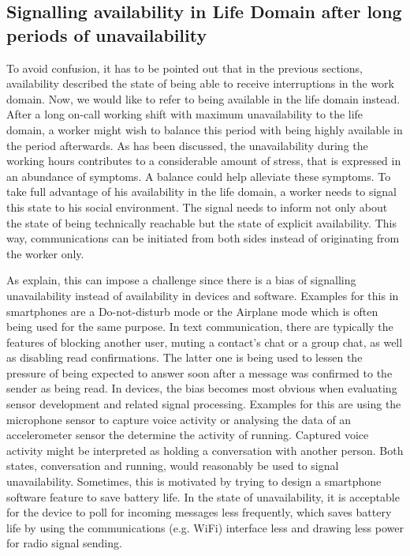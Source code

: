 \documentclass{CML_Seminar_Template}
\begin{document}
\subsection{Signalling availability in Life Domain after long periods of unavailability}
To avoid confusion, it has to be pointed out that in the previous sections, availability described the state of being able to receive interruptions in the work domain. Now, we would like to refer to being available in the life domain instead. After a long on-call working shift with maximum unavailability to the life domain, a worker might wish to balance this period with being highly available in the period afterwards. As has been discussed, the unavailability during the working hours contributes to a considerable amount of stress, that is expressed in an abundance of symptoms. A balance could help alleviate these symptoms. To take full advantage of his availability in the life domain, a worker needs to signal this state to his social environment. The signal needs to inform not only about the state of being technically reachable but the state of explicit availability. This way, communications can be initiated from both sides instead of originating from the worker only.
\par
As \cite[]{Fetter2018} explain, this can impose a challenge since there is a bias of signalling unavailability instead of availability in devices and software. Examples for this in smartphones are a Do-not-disturb mode or the Airplane mode which is often being used for the same purpose. In text communication, there are typically the features of blocking another user, muting a contact's chat or a group chat, as well as disabling read confirmations. The latter one is being used to lessen the pressure of being expected to answer soon after a message was confirmed to the sender as being read. In devices, the bias becomes most obvious when evaluating sensor development and related signal processing. Examples for this are using the microphone sensor to capture voice activity or analysing the data of an accelerometer sensor the determine the activity of running. Captured voice activity might be interpreted as holding a conversation with another person. Both states, conversation and running, would reasonably be used to signal unavailability. Sometimes, this is motivated by trying to design a smartphone software feature to save battery life. In the state of unavailability, it is acceptable for the device to poll for incoming messages less frequently, which saves battery life by using the communications (e.g. WiFi) interface less and drawing less power for radio signal sending.
\end{document}
